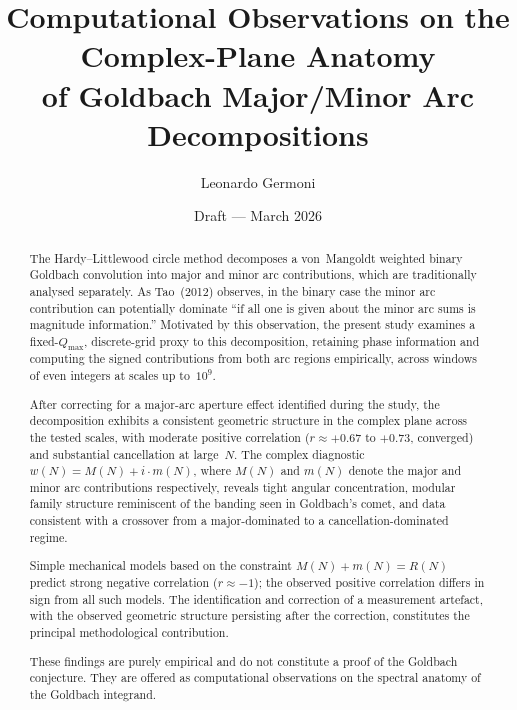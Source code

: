 \documentclass[11pt,a4paper]{article}
\title{Computational Observations on the Complex-Plane Anatomy\\of Goldbach Major/Minor Arc Decompositions}
\author{Leonardo Germoni}
\date{Draft --- March 2026}
\newcommand{\RN}{R(N)}
\newcommand{\MN}{M(N)}
\newcommand{\mN}{m(N)}
\newcommand{\wN}{w(N)}
\newcommand{\Qmax}{Q_{\max}}
\begin{document}
\maketitle


\begin{abstract}
The Hardy--Littlewood circle method decomposes a von~Mangoldt weighted binary Goldbach convolution into major and minor arc contributions, which are traditionally analysed separately. As Tao~(2012) observes, in the binary case the minor arc contribution can potentially dominate ``if all one is given about the minor arc sums is magnitude information.'' Motivated by this observation, the present study examines a fixed-$\Qmax$, discrete-grid proxy to this decomposition, retaining phase information and computing the signed contributions from both arc regions empirically, across windows of even integers at scales up to~$10^9$.

After correcting for a major-arc aperture effect identified during the study, the decomposition exhibits a consistent geometric structure in the complex plane across the tested scales, with moderate positive correlation ($r \approx +0.67$ to $+0.73$, converged) and substantial cancellation at large~$N$. The complex diagnostic $\wN = \MN + i \cdot \mN$, where $\MN$ and $\mN$ denote the major and minor arc contributions respectively, reveals tight angular concentration, modular family structure reminiscent of the banding seen in Goldbach's comet, and data consistent with a crossover from a major-dominated to a cancellation-dominated regime.

Simple mechanical models based on the constraint $\MN + \mN = \RN$ predict strong negative correlation ($r \approx -1$); the observed positive correlation differs in sign from all such models. The identification and correction of a measurement artefact, with the observed geometric structure persisting after the correction, constitutes the principal methodological contribution.

These findings are purely empirical and do not constitute a proof of the Goldbach conjecture. They are offered as computational observations on the spectral anatomy of the Goldbach integrand.
\end{abstract}

\end{document}

